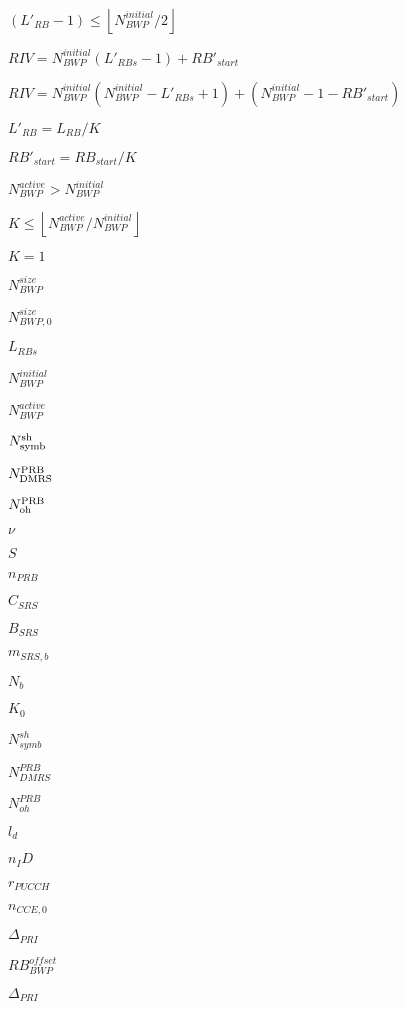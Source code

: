 \documentclass{article}
\begin{document}
$(L'_{RB} - 1) \leq \left \lfloor N_{BWP}^{initial}/2 \right \rfloor$
\pagebreak

$RIV = N_{BWP}^{initial}(L'_{RBs}-1)+RB'_{start}$
\pagebreak

$RIV = N_{BWP}^{initial}(N_{BWP}^{initial}-L'_{RBs}+1)+(N_{BWP}^{initial}-1-RB'_{start})$
\pagebreak

$L'_{RB}=L_{RB}/K$
\pagebreak

$RB'_{start}=RB_{start}/K$
\pagebreak

$N_{BWP}^{active}>N_{BWP}^{initial}$
\pagebreak

$K \leq \left \lfloor N_{BWP}^{active}/ N_{BWP}^{initial}\right \rfloor$
\pagebreak

$K=1$
\pagebreak

$N_{BWP}^{size}$
\pagebreak

$N_{BWP,0}^{size}$
\pagebreak

$L_{RBs}$
\pagebreak

$N_{BWP}^{initial}$
\pagebreak

$N_{BWP}^{active}$
\pagebreak

$N_{\textup{symb}}^{\textup{sh}}$
\pagebreak

$N_{\textup{DMRS}}^{\textup{PRB}}$
\pagebreak

$N_{\textup{oh}}^{\textup{PRB}}$
\pagebreak

$\nu$
\pagebreak

$S$
\pagebreak

$n_{PRB}$
\pagebreak

$C_{SRS}$
\pagebreak

$B_{SRS}$
\pagebreak

$m_{SRS,b}$
\pagebreak

$N_{b}$
\pagebreak

$K_0$
\pagebreak

$N_{symb}^{sh}$
\pagebreak

$N_{DMRS}^{PRB}$
\pagebreak

$N_{oh}^{PRB}$
\pagebreak

$l_d$
\pagebreak

$n_ID$
\pagebreak

$r_{PUCCH}$
\pagebreak

$n_{CCE,0}$
\pagebreak

$\Delta _{PRI}$
\pagebreak

$RB_{BWP}^{offset}$
\pagebreak

$\Delta_{PRI}$
\pagebreak
\end{document}
